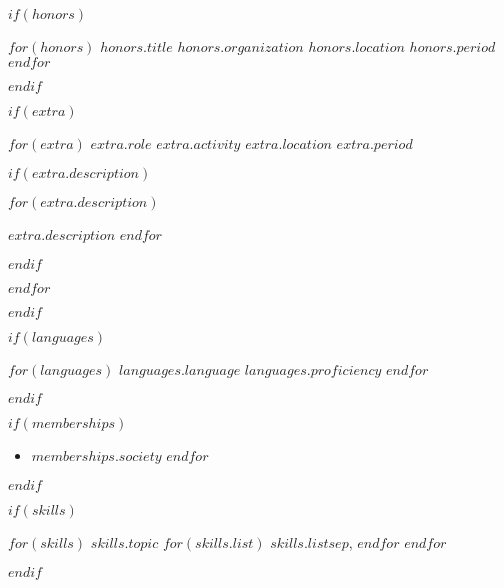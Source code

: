 \documentclass[12pt, letterpaper]{awesome-cv}
\begin{document}
$if(honors)$
  \begin{cvhonors}
    $for(honors)$
      \cvhonor
      {$honors.title$}
      {$honors.organization$}
      {$honors.location$}
      {$honors.period$}
    $endfor$
  \end{cvhonors}
$endif$

$if(extra)$
  \begin{cventries}

    $for(extra)$
      \cventry
      {$extra.role$}
      {$extra.activity$}
      {$extra.location$}
      {$extra.period$}
      {
        $if(extra.description)$
          \begin{cvitems}
            $for(extra.description)$
              \item{$extra.description$}
            $endfor$
          \end{cvitems}
        $endif$
      }

    $endfor$
  \end{cventries}
$endif$

$if(languages)$
  \begin{cvskills}
    $for(languages)$
      \cvskill
      {$languages.language$}
      {$languages.proficiency$}
    $endfor$
  \end{cvskills}
$endif$

$if(memberships)$

    \begin{cvparagraph}
        \begin{itemize}[noitemsep]
          $for(memberships)$
            \item {$memberships.society$}
          $endfor$
      \end{itemize}
    \end{cvparagraph}
$endif$

$if(skills)$
  \begin{cvskills}
    $for(skills)$
      \cvskill
      {$skills.topic$}
      {
        $for(skills.list)$
          $skills.list$$sep$,
        $endfor$
      }
    $endfor$
  \end{cvskills}
$endif$

\end{document}
